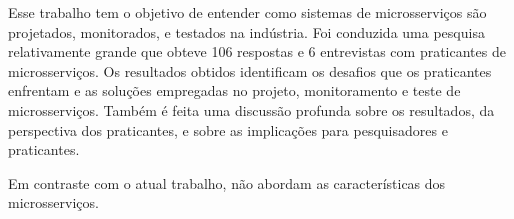 Esse trabalho tem o objetivo de entender como sistemas de microsserviços são projetados, monitorados, e testados na indústria. Foi conduzida uma pesquisa relativamente grande que obteve 106 respostas e 6 entrevistas com praticantes de microsserviços. Os resultados obtidos identificam os desafios que os praticantes enfrentam e as soluções empregadas no projeto, monitoramento e teste de microsserviços. Também é feita uma discussão profunda sobre os resultados, da perspectiva dos praticantes, e sobre as implicações para pesquisadores e praticantes.

Em contraste com o atual trabalho,  não abordam as características dos microsserviços.



